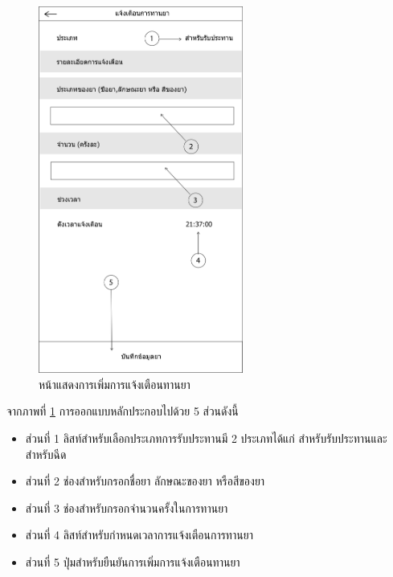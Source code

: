 		\begin{figure}[H]
			\centering
			\includegraphics[width=0.6\textwidth]{Figures/3/UI/addnotification}
			\caption{หน้าแสดงการเพิ่มการแจ้งเตือนทานยา}
			\label{Fig:เพิ่มทานยา}
		\end{figure}
		จากภาพที่ \ref{Fig:เพิ่มทานยา} การออกแบบหลักประกอบไปด้วย 5 ส่วนดังนี้
		\begin{itemize}
			\item ส่วนที่ 1 ลิสท์สำหรับเลือกประเภทการรับประทานมี 2 ประเภทได้แก่ สำหรับรับประทานและสำหรับฉีด
			\item ส่วนที่ 2 ช่องสำหรับกรอกชื่อยา ลักษณะของยา หรือสีของยา
			\item ส่วนที่ 3 ช่องสำหรับกรอกจำนวนครั้งในการทานยา
			\item ส่วนที่ 4 ลิสท์สำหรับกำหนดเวลาการแจ้งเตือนการทานยา
			\item ส่วนที่ 5 ปุ่มสำหรับยืนยันการเพิ่มการแจ้งเตือนทานยา
		\end{itemize} \\

